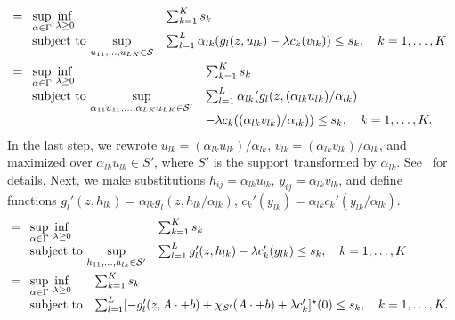 \begin{equation*}
	\begin{aligned}
&= \begin{array}[t]{ll}
	\underset{\alpha \in \Gamma}{\sup}~\underset{\lambda \geq 0}{\inf} &\sum_{k=1}^K s_k  \\
	\mbox{subject to}~\underset{u_{11}, \dots, u_{LK} \in \mathcal{S}}{\sup}& \sum_{l=1}^L \alpha_{lk}(g_l(z,u_{lk}) - \lambda c_k(v_{lk})) \le s_k, \quad k = 1,\dots,K
\end{array}\\
&= \begin{array}[t]{ll}
	\underset{\alpha \in \Gamma}{\sup}~\underset{\lambda \geq 0}{\inf} &\sum_{k=1}^K s_k  \\
	\mbox{subject to}~\underset{\alpha_{11}u_{11}, \dots, \alpha_{LK}u_{LK} \in \mathcal{S}'}{\sup}& \sum_{l=1}^L \alpha_{lk}(g_l(z,(\alpha_{lk}u_{lk})/\alpha_{lk}) \\
	& - \lambda c_k((\alpha_{lk}v_{lk})/\alpha_{lk})) \le s_k, \quad k = 1,\dots,K.
\end{array}\\
\end{aligned}
\end{equation*}
In the last step, we rewrote $u_{lk} = (\alpha_{lk}u_{lk})/\alpha_{lk}$, $v_{lk} = (\alpha_{lk}v_{lk})/\alpha_{lk}$, and maximized over $\alpha_{lk}u_{lk} \in S'$, where $S'$ is the support transformed by $\alpha_{lk}$. See~\cite{mro} for details. 
Next, we make substitutions $h_{ij} = \alpha_{lk}u_{lk}$, $y_{ij} = \alpha_{lk}v_{lk}$, and define functions $g_l'(z,h_{lk}) = \alpha_{lk}g_l(z,h_{lk}/\alpha_{lk})$, $c_k'(y_{lk}) = \alpha_{lk}c_k'(y_{lk}/\alpha_{lk})$.
\begin{equation*}
	\begin{aligned}
&= \begin{array}[t]{ll}
	\underset{\alpha \in \Gamma}{\sup}~\underset{\lambda \geq 0}{\inf} &\sum_{k=1}^K s_k  \\
	\mbox{subject to}~\underset{h_{11}, \dots, h_{lk} \in \mathcal{S}'}{\sup}& \sum_{l=1}^L g_l'(z,h_{lk})- \lambda c_k'(y_{lk}) \le s_k, \quad k = 1,\dots,K
\end{array}\\
&= \begin{array}[t]{ll}
	\underset{\alpha \in \Gamma}{\sup}~\underset{\lambda \geq 0}{\inf} &\sum_{k=1}^K s_k  \\
	\mbox{subject to}& \sum_{l=1}^L [-g_l'(z, A\cdot + b) +\chi_{\mathcal{S}'}( A\cdot + b) + \lambda c_k']^\star(0) \le s_k, \quad k = 1,\dots,K.
\end{array}\\
\end{aligned}
\end{equation*}
